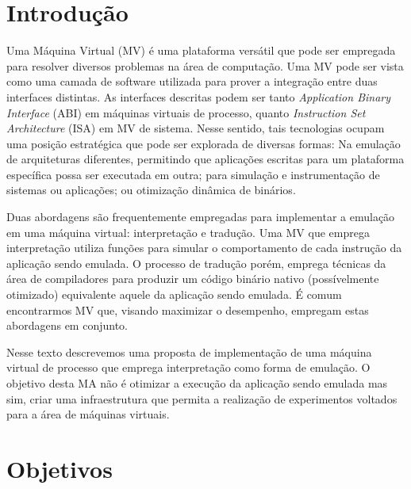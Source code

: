 \documentclass[11pt,twoside]{article}
\begin{document}
\section{Introdução}

Uma Máquina Virtual (MV) é uma plataforma versátil que pode ser empregada para resolver diversos problemas na área de computação. 
Uma MV pode ser vista como uma camada de software utilizada para prover a integração entre duas interfaces distintas.
As interfaces descritas podem ser tanto \emph{Application Binary Interface} (ABI) em máquinas virtuais de processo, quanto \emph{Instruction Set Architecture} (ISA) em MV de sistema.
Nesse sentido, tais tecnologias ocupam uma posição estratégica que pode ser explorada de diversas formas:
Na emulação de arquiteturas diferentes, permitindo que aplicações escritas para um plataforma específica possa ser executada em outra; para simulação e instrumentação de sistemas ou aplicações; ou otimização dinâmica de binários.

Duas abordagens são frequentemente empregadas para implementar a emulação
em uma máquina virtual: interpretação e tradução. Uma MV que emprega 
interpretação utiliza funções para simular o comportamento de cada instrução
da aplicação sendo emulada. O processo de tradução porém, emprega técnicas
da área de compiladores para produzir um código binário nativo (possívelmente
otimizado) equivalente aquele da aplicação sendo emulada. É comum encontrarmos 
MV que, visando maximizar o desempenho, empregam estas abordagens em conjunto.

Nesse texto descrevemos uma proposta de implementação de uma máquina virtual
de processo que emprega interpretação como forma de emulação. O objetivo desta
MA não é otimizar a execução da aplicação sendo emulada mas sim, criar uma
infraestrutura que permita a realização de experimentos voltados para a área
de máquinas virtuais.
   
\section{Objetivos}
% 
\end{document}
